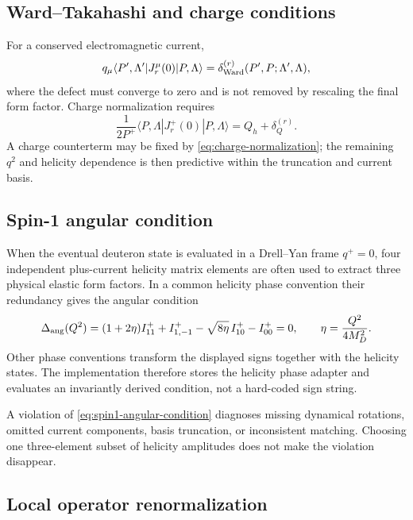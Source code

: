 \documentclass[11pt]{article}
\begin{document}
\subsection{Ward--Takahashi and charge conditions}

For a conserved electromagnetic current,
\begin{equation}
 q_\mu\langle P',\Lambda'|J_r^\mu(0)|P,\Lambda\rangle
 =\delta_{\rm Ward}^{(r)}(P',P;\Lambda',\Lambda),
\label{eq:ward-identity}
\end{equation}
where the defect must converge to zero and is not removed by rescaling the
final form factor.  Charge normalization requires
\begin{equation}
 \frac{1}{2P^+}
 \langle P,\Lambda|J_r^+(0)|P,\Lambda\rangle
 =Q_h+\delta_Q^{(r)}.
\label{eq:charge-normalization}
\end{equation}
A charge counterterm may be fixed by \cref{eq:charge-normalization}; the
remaining \(q^2\) and helicity dependence is then predictive within the
truncation and current basis.

\subsection{Spin-1 angular condition}

When the eventual deuteron state is evaluated in a Drell--Yan frame
\(q^+=0\), four independent plus-current helicity matrix elements are often
used to extract three physical elastic form factors.  In a common helicity
phase convention their redundancy gives the angular condition
\begin{equation}
 \Delta_{\rm ang}(Q^2)
 =(1+2\eta)I^+_{11}
 +I^+_{1,-1}
 -\sqrt{8\eta}\,I^+_{10}
 -I^+_{00}=0,
 \qquad
 \eta=\frac{Q^2}{4M_D^2}.
\label{eq:spin1-angular-condition}
\end{equation}
Other phase conventions transform the displayed signs together with the
helicity states.  The implementation therefore stores the helicity phase
adapter and evaluates an invariantly derived condition, not a hard-coded
sign string.

A violation of \cref{eq:spin1-angular-condition} diagnoses missing dynamical
rotations, omitted current components, basis truncation, or inconsistent
matching.  Choosing one three-element subset of helicity amplitudes does not
make the violation disappear.

\subsection{Local operator renormalization}
\end{document}
